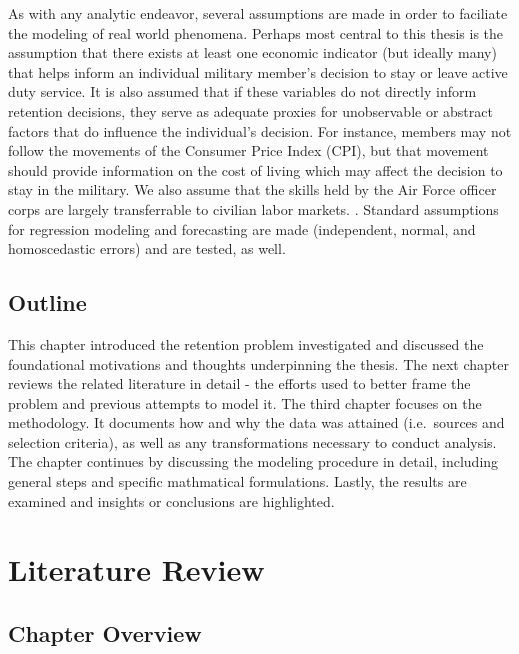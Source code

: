 \documentclass[12pt,letterpaper,toc=flat,oneside]{report}
\theoremstyle{definition}
\theoremstyle{definition}
\theoremstyle{definition}
\theoremstyle{remark}
\begin{document}
As with any analytic endeavor, several assumptions are made in order to
faciliate the modeling of real world phenomena. Perhaps most central to
this thesis is the assumption that there exists at least one economic
indicator (but ideally many) that helps inform an individual military
member's decision to stay or leave active duty service. It is also
assumed that if these variables do not directly inform retention
decisions, they serve as adequate proxies for unobservable or abstract
factors that do influence the individual's decision. For instance,
members may not follow the movements of the Consumer Price Index (CPI),
but that movement should provide information on the cost of living which
may affect the decision to stay in the military. We also assume that the
skills held by the Air Force officer corps are largely transferrable to
civilian labor markets. . Standard assumptions for regression modeling
and forecasting are made (independent, normal, and homoscedastic errors)
and are tested, as well.

\hypertarget{outline}{%
\section{Outline}\label{outline}}

This chapter introduced the retention problem investigated and discussed
the foundational motivations and thoughts underpinning the thesis. The
next chapter reviews the related literature in detail - the efforts used
to better frame the problem and previous attempts to model it. The third
chapter focuses on the methodology. It documents how and why the data
was attained (i.e.~sources and selection criteria), as well as any
transformations necessary to conduct analysis. The chapter continues by
discussing the modeling procedure in detail, including general steps and
specific mathmatical formulations. Lastly, the results are examined and
insights or conclusions are highlighted.

\newpage

\hypertarget{literature-review}{%
\chapter{Literature Review}\label{literature-review}}

\hypertarget{chapter-overview}{%
\section{Chapter Overview}\label{chapter-overview}}
\end{document}
